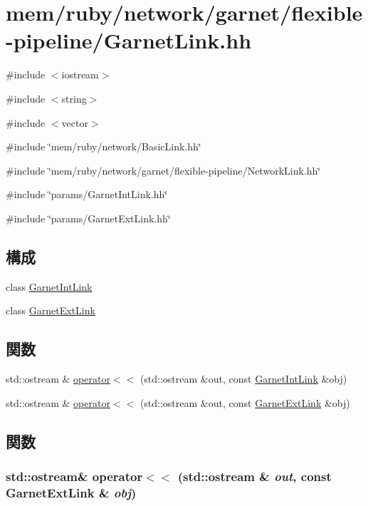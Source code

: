 \hypertarget{GarnetLink_8hh}{
\section{mem/ruby/network/garnet/flexible-\/pipeline/GarnetLink.hh}
\label{GarnetLink_8hh}
}
{\ttfamily \#include $<$iostream$>$}\par
{\ttfamily \#include $<$string$>$}\par
{\ttfamily \#include $<$vector$>$}\par
{\ttfamily \#include \char`\"{}mem/ruby/network/BasicLink.hh\char`\"{}}\par
{\ttfamily \#include \char`\"{}mem/ruby/network/garnet/flexible-\/pipeline/NetworkLink.hh\char`\"{}}\par
{\ttfamily \#include \char`\"{}params/GarnetIntLink.hh\char`\"{}}\par
{\ttfamily \#include \char`\"{}params/GarnetExtLink.hh\char`\"{}}\par
\subsection*{構成}
\begin{DoxyCompactItemize}
\item 
class \hyperlink{classGarnetIntLink}{GarnetIntLink}
\item 
class \hyperlink{classGarnetExtLink}{GarnetExtLink}
\end{DoxyCompactItemize}
\subsection*{関数}
\begin{DoxyCompactItemize}
\item 
std::ostream \& \hyperlink{GarnetLink_8hh_aef8b8ae4c91965d9642157fd986a34e3}{operator$<$$<$} (std::ostream \&out, const \hyperlink{classGarnetIntLink}{GarnetIntLink} \&obj)
\item 
std::ostream \& \hyperlink{GarnetLink_8hh_a268c096c38c31806427d4ccd021946db}{operator$<$$<$} (std::ostream \&out, const \hyperlink{classGarnetExtLink}{GarnetExtLink} \&obj)
\end{DoxyCompactItemize}


\subsection{関数}
\hypertarget{GarnetLink_8hh_a268c096c38c31806427d4ccd021946db}{
\subsubsection[{operator$<$$<$}]{\setlength{\rightskip}{0pt plus 5cm}std::ostream\& operator$<$$<$ (std::ostream \& {\em out}, \/  const {\bf GarnetExtLink} \& {\em obj})}}
\label{GarnetLink_8hh_a268c096c38c31806427d4ccd021946db}



